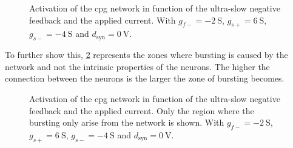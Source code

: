 \begin{figure}[!htb]
    \centering
    \caption{Activation of the cpg network in function of the ultra-slow negative feedback and the applied current. With $g_{f-}=\qty{-2}{\siemens}$, $g_{s+}=\qty{6}{\siemens}$, $g_{s-}=\qty{-4}{\siemens}$ and $d_\text{syn} = \qty{0}{\volt}$.}
    \label{fig:cpg_act}
\end{figure}

To further show this, \cref{fig:cpg_only_act} represents the zones where bursting is caused by the network and not the intrinsic properties of the neurons. The higher the connection between the neurons is the larger the zone of bursting becomes.

\begin{figure}[!htb]
    \centering
    \caption{Activation of the cpg network in function of the ultra-slow negative feedback and the applied current. Only the region where the bursting only arise from the network is shown. With $g_{f-}=\qty{-2}{\siemens}$, $g_{s+}=\qty{6}{\siemens}$, $g_{s-}=\qty{-4}{\siemens}$ and $d_\text{syn} = \qty{0}{\volt}$.}
    \label{fig:cpg_only_act}
\end{figure}
